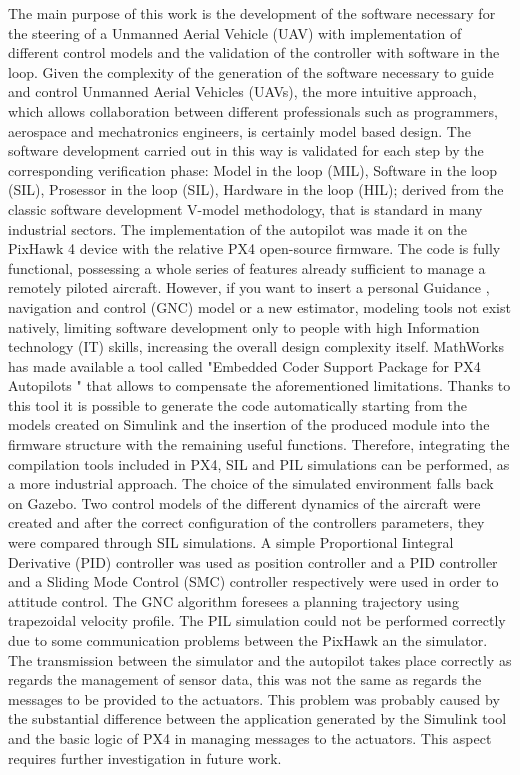 \begin{commento}
The main purpose of this work is the development of the software necessary for the steering of a Unmanned Aerial Vehicle (UAV) with implementation of different control models and  the validation of the controller with software in the loop.
Given the complexity of the generation of the software necessary to guide and control Unmanned Aerial Vehicles (UAVs), the more intuitive approach, which allows collaboration between different professionals such as programmers, aerospace and mechatronics engineers, is certainly model based design.
The software development carried out in this way is validated for each step by the corresponding verification phase: Model in the loop (MIL), Software in the loop (SIL), Prosessor in the loop (SIL), Hardware in the loop (HIL); derived from the classic software development V-model methodology, that is standard in many industrial sectors.
The implementation of the autopilot was made it on the PixHawk 4 device with the relative PX4 open-source firmware. The code is fully functional, possessing a whole series of features already sufficient to manage a remotely piloted aircraft. However, if you want to insert a personal Guidance , navigation and control (GNC) model or a new estimator, modeling tools not exist natively, limiting software development only to people with high Information technology (IT) skills, increasing the  overall design complexity itself.
MathWorks has made available a tool called "Embedded Coder Support Package
for PX4 Autopilots " that allows to compensate the aforementioned limitations. Thanks to this tool it is possible to generate the code automatically starting from the models created on Simulink and the insertion of the produced module into the firmware structure with the remaining useful functions. Therefore, integrating the compilation tools included in PX4, SIL and PIL simulations can be performed, as a more industrial approach.
The choice of the simulated environment falls back on Gazebo.
Two control models of the different dynamics of the aircraft were created and after the correct configuration of the controllers parameters, they were compared through SIL simulations. A simple Proportional Iintegral Derivative (PID) controller was used as position controller and a PID controller and a Sliding Mode Control (SMC) controller respectively were used in order to attitude control. The GNC algorithm foresees a planning trajectory using trapezoidal velocity profile.
The PIL simulation could not be performed correctly due to some communication problems between the PixHawk an the simulator. The transmission between the simulator and the autopilot takes place correctly as regards the management of sensor data, this was not the same as regards the messages to be provided to the actuators. This problem was probably caused by the substantial difference between the application generated by the Simulink tool and the basic logic of PX4 in managing messages to the actuators. This aspect requires further investigation in future work.



\end{commento}

